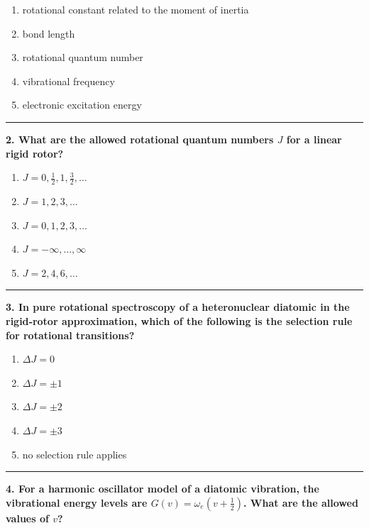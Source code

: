 \documentclass[
  english,
  9pt,
]{extbook}
\providecommand{\tightlist}{%
  \setlength{\itemsep}{0pt}\setlength{\parskip}{0pt}}
\theoremstyle{definition}
\theoremstyle{definition}
\theoremstyle{definition}
\theoremstyle{definition}
\theoremstyle{remark}
\begin{document}
\begin{enumerate}
\def\labelenumi{\alph{enumi}.}
\tightlist
\item
  rotational constant related to the moment of inertia
\item
  bond length
\item
  rotational quantum number
\item
  vibrational frequency
\item
  electronic excitation energy
\end{enumerate}

\begin{center}\rule{0.5\linewidth}{0.5pt}\end{center}

\textbf{2. What are the allowed rotational quantum numbers \(J\) for a linear rigid rotor?}

\begin{enumerate}
\def\labelenumi{\alph{enumi}.}
\tightlist
\item
  \(J = 0, \tfrac{1}{2}, 1, \tfrac{3}{2}, \dots\)
\item
  \(J = 1, 2, 3, \dots\)
\item
  \(J = 0, 1, 2, 3, \dots\)
\item
  \(J = -\infty, \dots, \infty\)
\item
  \(J = 2, 4, 6, \dots\)
\end{enumerate}

\begin{center}\rule{0.5\linewidth}{0.5pt}\end{center}

\textbf{3. In pure rotational spectroscopy of a heteronuclear diatomic in the rigid‑rotor approximation, which of the following is the selection rule for rotational transitions?}

\begin{enumerate}
\def\labelenumi{\alph{enumi}.}
\tightlist
\item
  \(\Delta J = 0\)
\item
  \(\Delta J = \pm 1\)
\item
  \(\Delta J = \pm 2\)
\item
  \(\Delta J = \pm 3\)
\item
  no selection rule applies
\end{enumerate}

\begin{center}\rule{0.5\linewidth}{0.5pt}\end{center}

\textbf{4. For a harmonic oscillator model of a diatomic vibration, the vibrational energy levels are \(G(v) = \omega_e \left( v + \frac{1}{2} \right)\). What are the allowed values of \(v\)?}
\end{document}
